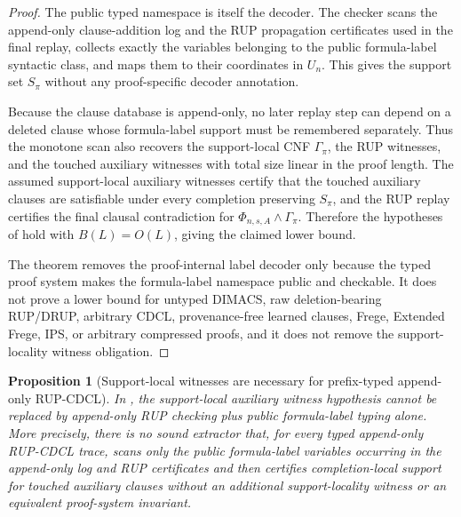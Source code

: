 \documentclass[11pt]{article}
\newtheorem{proposition}[theorem]{Proposition}
\theoremstyle{definition}
\begin{document}
\begin{proof}
The public typed namespace is itself the decoder.  The checker scans the
append-only clause-addition log and the RUP propagation certificates used in
the final replay, collects exactly the variables belonging to the public
formula-label syntactic class, and maps them to their coordinates in \(U_n\).
This gives the support set \(S_\pi\) without any proof-specific decoder
annotation.

Because the clause database is append-only, no later replay step can depend on
a deleted clause whose formula-label support must be remembered separately.
Thus the monotone scan also recovers the support-local CNF \(\Gamma_\pi\), the
RUP witnesses, and the touched auxiliary witnesses with total size linear in
the proof length.  The assumed support-local auxiliary witnesses certify that
the touched auxiliary clauses are satisfiable under every completion preserving
\(S_\pi\), and the RUP replay certifies the final clausal contradiction for
\(\Phi_{n,s,A}\wedge\Gamma_\pi\).  Therefore the hypotheses of
 hold with \(B(L)=O(L)\), giving
the claimed lower bound.

The theorem removes the proof-internal label decoder only because the typed
proof system makes the formula-label namespace public and checkable.  It does
not prove a lower bound for untyped DIMACS, raw deletion-bearing RUP/DRUP,
arbitrary CDCL, provenance-free learned clauses, Frege, Extended Frege, IPS, or
arbitrary compressed proofs, and it does not remove the support-locality
witness obligation.
\end{proof}

\begin{proposition}[Support-local witnesses are necessary for prefix-typed append-only RUP-CDCL]\label{prop:prefix-typed-rup-support-witness-necessity}
In , the support-local auxiliary
witness hypothesis cannot be replaced by append-only RUP checking plus public
formula-label typing alone.  More precisely, there is no sound extractor that,
for every typed append-only RUP-CDCL trace, scans only the public formula-label
variables occurring in the append-only log and RUP certificates and then
certifies completion-local support for touched auxiliary clauses without an
additional support-locality witness or an equivalent proof-system invariant.
\end{proposition}
\end{document}
